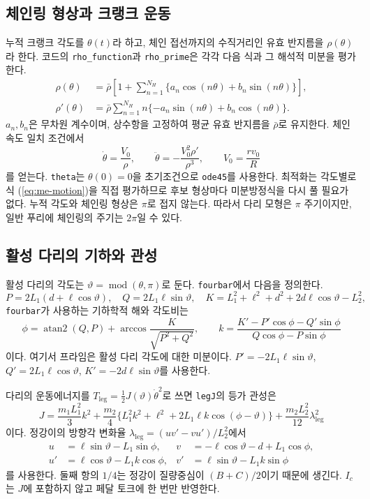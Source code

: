 \subsection{체인링 형상과 크랭크 운동}
누적 크랭크 각도를 \(\theta(t)\)라 하고, 체인 접선까지의 수직거리인 유효 반지름을 \(\rho(\theta)\)라 한다. 코드의 \texttt{rho\_function}과 \texttt{rho\_prime}은 각각 다음 식과 그 해석적 미분을 평가한다.
\begin{align}
\rho(\theta)&=\bar\rho\left[1+\sum_{n=1}^{N_H}\{a_n\cos(n\theta)+b_n\sin(n\theta)\}\right],\label{eq:14}\\
\rho'(\theta)&=\bar\rho\sum_{n=1}^{N_H}n\{-a_n\sin(n\theta)+b_n\cos(n\theta)\}.\label{eq:me-rhop}
\end{align}
\(a_n,b_n\)은 무차원 계수이며, 상수항을 고정하여 평균 유효 반지름을 \(\bar\rho\)로 유지한다.
체인 속도 일치 조건에서
\begin{equation}
\dot\theta=\frac{V_0}{\rho},\qquad
\ddot\theta=-\frac{V_0^2\rho'}{\rho^3},\qquad V_0=\frac{r v_0}{R}
\label{eq:me-motion}
\end{equation}
를 얻는다. \texttt{theta}는 \(\theta(0)=0\)을 초기조건으로 \texttt{ode45}를 사용한다. 최적화는 각도별로 식 (\ref{eq:me-motion})을 직접 평가하므로 후보 형상마다 미분방정식을 다시 풀 필요가 없다. 누적 각도와 체인링 형상은 \(\pi\)로 접지 않는다. 따라서 다리 모형은 \(\pi\) 주기이지만, 일반 푸리에 체인링의 주기는 \(2\pi\)일 수 있다.

\subsection{활성 다리의 기하와 관성}
활성 다리의 각도는 \(\vartheta=\operatorname{mod}(\theta,\pi)\)로 둔다. \texttt{fourbar}에서 다음을 정의한다.
\[
P=2L_1(d+\ell\cos\vartheta),\quad Q=2L_1\ell\sin\vartheta,\quad
K=L_1^2+\ell^2+d^2+2d\ell\cos\vartheta-L_2^2,
\]
\texttt{fourbar}가 사용하는 기하학적 해와 각도비는
\begin{equation}
\phi=\operatorname{atan2}(Q,P)+\arccos\frac{K}{\sqrt{P^2+Q^2}},\qquad
k=\frac{K'-P'\cos\phi-Q'\sin\phi}{Q\cos\phi-P\sin\phi}
\label{eq:me-fourbar}
\end{equation}
이다. 여기서 프라임은 활성 다리 각도에 대한 미분이다. \(P'=-2L_1\ell\sin\vartheta\), \(Q'=2L_1\ell\cos\vartheta\), \(K'=-2d\ell\sin\vartheta\)를 사용한다.

다리의 운동에너지를 \(T_{\mathrm{leg}}=\tfrac12J(\vartheta)\dot\theta^2\)로 쓰면 \texttt{legJ}의 등가 관성은
\begin{equation}
J=\frac{m_1L_1^2}{3}k^2+
\frac{m_2}{4}\{L_1^2k^2+\ell^2+2L_1\ell k\cos(\phi-\vartheta)\}
+\frac{m_2L_2^2}{12}\lambda_{\mathrm{leg}}^2
\label{eq:me-inertia}
\end{equation}
이다. 정강이의 방향각 변화율 \(\lambda_{\mathrm{leg}}=(uv'-vu')/L_2^2\)에서
\[
\begin{aligned}
u&=\ell\sin\vartheta-L_1\sin\phi,&v&=-\ell\cos\vartheta-d+L_1\cos\phi,\\
u'&=\ell\cos\vartheta-L_1k\cos\phi,&v'&=\ell\sin\vartheta-L_1k\sin\phi
\end{aligned}
\]
를 사용한다. 둘째 항의 \(1/4\)는 정강이 질량중심이 \((B+C)/2\)이기 때문에 생긴다. \(I_c\)는 \(J\)에 포함하지 않고 페달 토크에 한 번만 반영한다.

